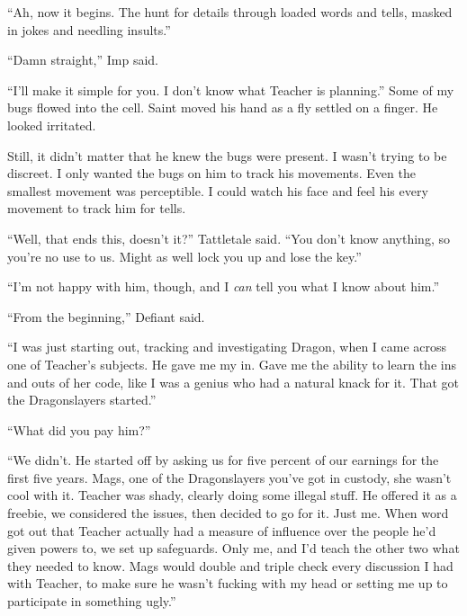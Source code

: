 ``Ah, now it begins.  The hunt for details through loaded words and tells, masked in jokes and needling insults.''



``Damn straight,'' Imp said.



``I'll make it simple for you.  I don't know what Teacher is planning.''  Some of my bugs flowed into the cell.  Saint moved his hand as a fly settled on a finger.  He looked irritated.



Still, it didn't matter that he knew the bugs were present.  I wasn't trying to be discreet.  I only wanted the bugs on him to track his movements.  Even the smallest movement was perceptible.  I could watch his face and feel his every movement to track him for tells.



``Well, that ends this, doesn't it?''  Tattletale said.  ``You don't know anything, so you're no use to us.  Might as well lock you up and lose the key.''



``I'm not happy with him, though, and I \emph{can} tell you what I know about him.''



``From the beginning,'' Defiant said.



``I was just starting out, tracking and investigating Dragon, when I came across one of Teacher's subjects.  He gave me my in.  Gave me the ability to learn the ins and outs of her code, like I was a genius who had a natural knack for it.  That got the Dragonslayers started.''



``What did you pay him?''



``We didn't.  He started off by asking us for five percent of our earnings for the first five years.  Mags, one of the Dragonslayers you've got in custody, she wasn't cool with it.  Teacher was shady, clearly doing some illegal stuff.  He offered it as a freebie, we considered the issues, then decided to go for it.  Just me.  When word got out that Teacher actually had a measure of influence over the people he'd given powers to, we set up safeguards.  Only me, and I'd teach the other two what they needed to know.  Mags would double and triple check every discussion I had with Teacher, to make sure he wasn't fucking with my head or setting me up to participate in something ugly.''



